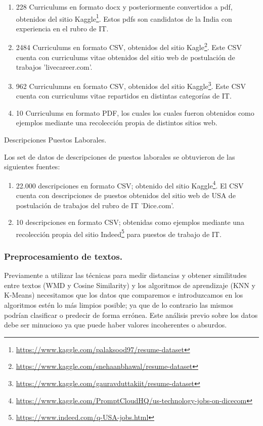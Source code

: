 \documentclass[12pt,a4paper]{article}
\makeatletter
\renewcommand\paragraph{\@startsection{paragraph}{4}{\z@}
            {-2.5ex\@plus -1ex \@minus -.25ex}
            {1.25ex \@plus .25ex}
            {\normalfont\normalsize\bfseries}}
\makeatother
\begin{document}
\begin{sloppypar}
\begin{enumerate}
\item 228 Curriculums en formato docx y posteriormente convertidos a pdf, obtenidos del sitio Kaggle\footnote{\url{https://www.kaggle.com/palaksood97/resume-dataset}}. Estos pdfs son candidatos de la India con experiencia en el rubro de IT.
\item 2484 Curriculums en formato CSV, obtenidos del sitio Kagle\footnote{\url{https://www.kaggle.com/snehaanbhawal/resume-dataset}}. Este CSV cuenta con curriculums vitae obtenidos del sitio web de postulación de trabajos 'livecareer.com'.
\item 962 Curriculumns en formato CSV, obtenidos del sitio Kaggle\footnote{\url{https://www.kaggle.com/gauravduttakiit/resume-dataset}}. Este CSV cuenta con curriculums vitae repartidos en distintas categorías de IT.
\item 10 Curriculums en formato PDF, los cuales los cuales fueron obtenidos como ejemplos mediante una recolección propia de distintos sitios web. 
\end{enumerate}

\paragraph{Descripciones Puestos Laborales.}

Los set de datos de descripciones de puestos laborales se obtuvieron de las siguientes fuentes:

\begin{enumerate}
\item 22.000 descripciones en formato CSV; obtenido del sitio Kaggle\footnote{\url{https://www.kaggle.com/PromptCloudHQ/us-technology-jobs-on-dicecom}}. El CSV cuenta con descripciones de puestos obtenidos del sitio web de USA de postulación de trabajos del rubro de IT 'Dice.com'.
\item 10 descripciones en formato CSV; obtenidas como ejemplos mediante una recolección propia del sitio Indeed\footnote{\url{https://www.indeed.com/q-USA-jobs.html}} para puestos de trabajo de IT.
\end{enumerate}

\cleardoublepage

\subsubsection{Preprocesamiento de textos.}
Previamente a utilizar las técnicas para medir distancias y obtener similitudes entre textos (WMD y Cosine Similarity) y los algoritmos de aprendizaje (KNN y K-Means) necesitamos que los datos que comparemos e introduzcamos en los algoritmos estén lo más limpios posible; ya que de lo contrario las mismos podrían clasificar o predecir de forma errónea. Este análisis previo sobre los datos debe ser minucioso ya que puede haber valores incoherentes o absurdos.


\end{sloppypar}
\end{document}

